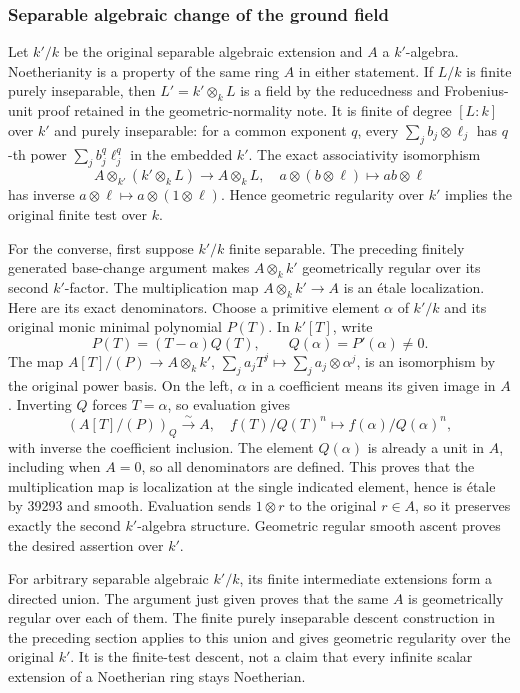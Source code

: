 \subsubsection{Separable algebraic change of the ground field}\label{algebra-proof-071-separable-algebraic-change-of-the-ground-field}

Let \(k'/k\) be the original separable algebraic extension and \(A\) a \(k'\)-algebra. Noetherianity is a property of the same ring \(A\) in either statement. If \(L/k\) is finite purely inseparable, then \(L'=k'\otimes_kL\) is a field by the reducedness and Frobenius-unit proof retained in the geometric-normality note. It is finite of degree \([L:k]\) over \(k'\) and purely inseparable: for a common exponent \(q\), every \(\sum_jb_j\otimes\ell_j\) has \(q\)-th power \(\sum_jb_j^q\ell_j^q\) in the embedded \(k'\). The exact associativity isomorphism \[
 A\otimes_{k'}(k'\otimes_kL)\longrightarrow A\otimes_kL,
 \quad a\otimes(b\otimes\ell)\longmapsto ab\otimes\ell
\] has inverse \(a\otimes\ell\mapsto a\otimes(1\otimes\ell)\). Hence geometric regularity over \(k'\) implies the original finite test over \(k\).

For the converse, first suppose \(k'/k\) finite separable. The preceding finitely generated base-change argument makes \(A\otimes_kk'\) geometrically regular over its second \(k'\)-factor. The multiplication map \(A\otimes_kk'\to A\) is an étale localization. Here are its exact denominators. Choose a primitive element \(\alpha\) of \(k'/k\) and its original monic minimal polynomial \(P(T)\). In \(k'[T]\), write \[
 P(T)=(T-\alpha)Q(T),\qquad Q(\alpha)=P'(\alpha)\ne0.
\] The map \(A[T]/(P)\to A\otimes_kk'\), \(\sum_j a_jT^j\mapsto\sum_j a_j\otimes\alpha^j\), is an isomorphism by the original power basis. On the left, \(\alpha\) in a coefficient means its given image in \(A\). Inverting \(Q\) forces \(T=\alpha\), so evaluation gives \[
 (A[T]/(P))_Q\xrightarrow{\sim}A,
 \quad f(T)/Q(T)^n\longmapsto f(\alpha)/Q(\alpha)^n,
\] with inverse the coefficient inclusion. The element \(Q(\alpha)\) is already a unit in \(A\), including when \(A=0\), so all denominators are defined. This proves that the multiplication map is localization at the single indicated element, hence is étale by 39293 and smooth. Evaluation sends \(1\otimes r\) to the original \(r\in A\), so it preserves exactly the second \(k'\)-algebra structure. Geometric regular smooth ascent proves the desired assertion over \(k'\).

For arbitrary separable algebraic \(k'/k\), its finite intermediate extensions form a directed union. The argument just given proves that the same \(A\) is geometrically regular over each of them. The finite purely inseparable descent construction in the preceding section applies to this union and gives geometric regularity over the original \(k'\). It is the finite-test descent, not a claim that every infinite scalar extension of a Noetherian ring stays Noetherian.

